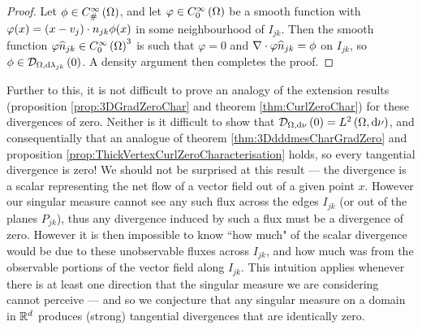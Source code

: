 \begin{proof}
	Let $\phi\in C^{\infty}_{\#}\left( \Omega \right)$, and let $\varphi\in C^{\infty}_{0}\left( \Omega \right)$ be a smooth function with $\varphi(x)=\left( x-v_j \right)\cdot n_{jk}\phi(x)$ in some neighbourhood of $I_{jk}$.
	Then the smooth function $\varphi\widehat{n}_{jk}\in C^{\infty}_{0}\left( \Omega \right)^3$ is such that $\varphi=0$ and $\nabla\cdot\varphi\widehat{n}_{jk}=\phi$ on $I_{jk}$, so $\phi\in\mathcal{D}_{\Omega,\mathrm{d}\lambda_{jk}}\left( 0 \right)$.
	A density argument then completes the proof.
\end{proof}
Further to this, it is not difficult to prove an analogy of the extension results (proposition \ref{prop:3DGradZeroChar} and theorem \ref{thm:CurlZeroChar}) for these divergences of zero.
Neither is it difficult to show that $\mathcal{D}_{\Omega,\mathrm{d}\nu}\left( 0 \right)=L^{2}\left( \Omega,\mathrm{d} \nu \right)$, and consequentially that an analogue of theorem \ref{thm:3DdddmesCharGradZero} and proposition \ref{prop:ThickVertexCurlZeroCharacterisation} holds, so every tangential divergence is zero!
We should not be surprised at this result --- the divergence is a scalar representing the net flow of a vector field out of a given point $x$.
However our singular measure cannot see any such flux across the edges $I_{jk}$ (or out of the planes $P_{jk}$), thus any divergence induced by such a flux must be a divergence of zero.
However it is then impossible to know ``how much" of the scalar divergence would be due to these unobservable fluxes across $I_{jk}$, and how much was from the observable portions of the vector field along $I_{jk}$.
This intuition applies whenever there is at least one direction that the singular measure we are considering cannot perceive --- and so we conjecture that any singular measure on a domain in $\mathbb{R}^d$ produces (strong) tangential divergences that are identically zero.

